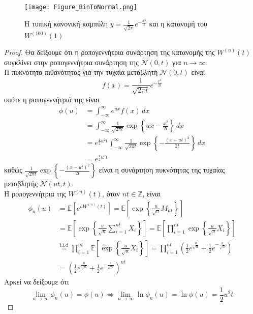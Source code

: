 \documentclass[12pt,a4paper,twoside,openany]{book}
\begin{document}
		\begin{figure}[h]
			\centering
			\texttt{[image: Figure\_BinToNormal.png]}
			\caption{Η τυπική κανονική καμπύλη $y=\frac{1}{\sqrt{2\pi}}e^{-\frac{x^2}{2}}$ και η κατανομή του $W^{(100)}(1)$}
			\label{fig:Binomial}
		\end{figure}
		
		\begin{proof}
			Θα δείξουμε ότι η ροπογεννήτρια συνάρτηση της κατανομής της $W^{(n)}(t)$ συγκλίνει στην ροπογεννήτρια συνάρτηση της $\mathcal{N}(0, t)$ για $n\rightarrow\infty$.\\ Η πυκνότητα πιθανότητας για την τυχαία μεταβλητή $\mathcal{N}(0, t)$ είναι
			\[f(x)= \frac{1}{\sqrt{2\pi t}}e^{-\frac{x^2}{2t}} \]
			οπότε η ροπογεννήτριά της είναι
			\begin{align*}
				\phi(u) &= \int_{-\infty}^{\infty}e^{ux}f(x) \, dx \\
						&= \int_{-\infty}^{\infty} \frac{1}{\sqrt{2\pi t}} \exp\left\{ux-\frac{x^2}{2t} \right\} \, dx \\
						&= e^{\frac{1}{2}u^2t} \int_{-\infty}^{\infty} \frac{1}{\sqrt{2\pi t}} \exp\left\{-\frac{(x-ut)^2}{2t} \right\} \, dx \\
						&=  e^{\frac{1}{2}u^2t}
			\end{align*}
			καθώς $\frac{1}{\sqrt{2\pi t}} \exp\left\{-\frac{(x-ut)^2}{2t}\right\}$ είναι η συνάρτηση πυκνότητας της τυχαίας μεταβλητής $\mathcal{N}(ut, t)$.
			\vspace{2.5mm}\\
			Η ροπογεννήτρια της $W^{(n)}(t)$, όταν $nt\in\mathbb{Z}$, είναι
			\begin{align*}
				\phi_n(u) &= \mathbb{E}\left[e^{uW^{(n)}(t)} \right] = \mathbb{E}\left[\exp\left\{\frac{u}{\sqrt{n}}M_{nt}\right\}\right] \\
						  &= \mathbb{E}\left[\exp\left\{\frac{u}{\sqrt{n}} \sum_{i=1}^{nt}X_i \right\}\right] 
						  = \mathbb{E}\left[\prod_{i=1}^{nt}\exp\left\{\frac{u}{\sqrt{n}} X_i \right\}\right] \\
						  &\stackrel{\mathrm{i.i.d}}{= }  \prod_{i=1}^{nt}\mathbb{E}\left[\exp\left\{\frac{u}{\sqrt{n}} X_i\right\} \right]= \prod_{i=1}^{nt}\left(\frac{1}{2}e^{\frac{u}{\sqrt{n}}} + \frac{1}{2}e^{-\frac{u}{\sqrt{n}}}\right) \\
						  &= \left(\frac{1}{2}e^{\frac{u}{\sqrt{n}}} + \frac{1}{2}e^{-\frac{u}{\sqrt{n}}}\right)^{nt}
			\end{align*}
			Αρκεί να δείξουμε ότι 
			\[\lim_{n\rightarrow\infty}\phi_n(u)= \phi(u) \iff \lim_{n\rightarrow\infty}\ln\phi_n(u) = \ln\phi(u) = \frac{1}{2}u^2t \]

\end{proof}
\end{document}
